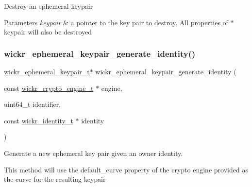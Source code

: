 Destroy an ephemeral keypair


\begin{DoxyParams}{Parameters}
{\em keypair} & a pointer to the key pair to destroy. All properties of \textquotesingle{}$\ast$keypair\textquotesingle{} will also be destroyed \\
\hline
\end{DoxyParams}
\mbox{\label{group__wickr__ephemeral__keypair_ga6c0935c579e3d4bdbfeada7cb60c2a1b}} 
\subsubsection{\texorpdfstring{wickr\_ephemeral\_keypair\_generate\_identity()}{wickr\_ephemeral\_keypair\_generate\_identity()}}
{\footnotesize\ttfamily \mbox{\hyperlink{structwickr__ephemeral__keypair}{wickr\+\_\+ephemeral\+\_\+keypair\+\_\+t}}$\ast$ wickr\+\_\+ephemeral\+\_\+keypair\+\_\+generate\+\_\+identity (\begin{DoxyParamCaption}\item[{const \mbox{\hyperlink{structwickr__crypto__engine}{wickr\+\_\+crypto\+\_\+engine\+\_\+t}} $\ast$}]{engine,  }\item[{uint64\+\_\+t}]{identifier,  }\item[{const \mbox{\hyperlink{structwickr__identity}{wickr\+\_\+identity\+\_\+t}} $\ast$}]{identity }\end{DoxyParamCaption})}

Generate a new ephemeral key pair given an owner identity.

This method will use the \textquotesingle{}default\+\_\+curve\textquotesingle{} property of the crypto engine provided as the curve for the resulting keypair


